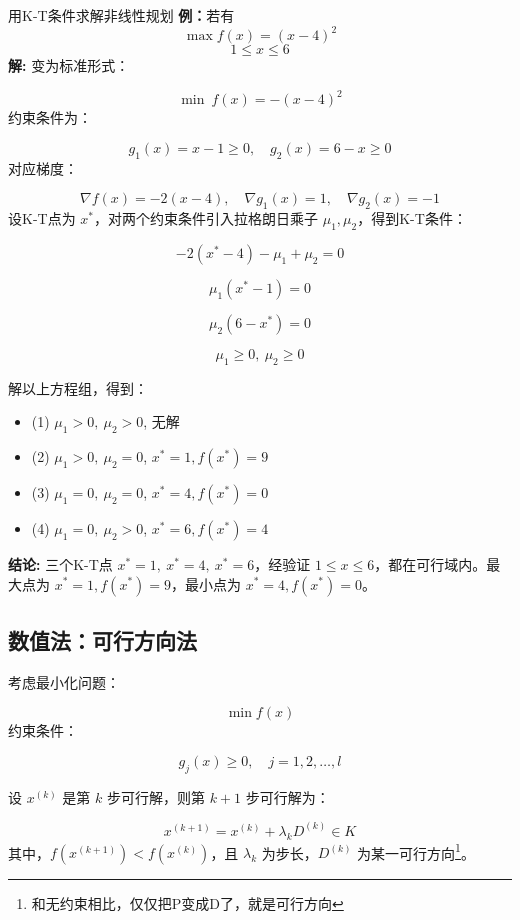 \begin{exbox}{用K-T条件求解非线性规划}{}
\textbf{例：}若有
$$
\max f(x)=(x-4)^2
$$
$$
1\leq x \leq 6
$$
\textbf{解:} 变为标准形式：

\[
\min \ f(x) = -(x-4)^2
\]
约束条件为：

\[
g_1(x) = x - 1 \geq 0, \quad g_2(x) = 6 - x \geq 0
\]
对应梯度：

\[
\nabla f(x) = -2(x - 4), \quad \nabla g_1(x) = 1, \quad \nabla g_2(x) = -1
\]
设K-T点为 \( x^* \)，对两个约束条件引入拉格朗日乘子 \( \mu_1, \mu_2 \)，得到K-T条件：

\[
-2(x^* - 4) - \mu_1 + \mu_2 = 0
\]

\[
\mu_1 (x^* - 1) = 0
\]

\[
\mu_2 (6 - x^*) = 0
\]

\[
\mu_1 \geq 0, \ \mu_2 \geq 0
\]

解以上方程组，得到：
\begin{itemize}
    \item (1) \( \mu_1 > 0, \ \mu_2 > 0 \), 无解
    \item (2) \( \mu_1 > 0, \ \mu_2 = 0 \), \( x^* = 1, f(x^*) = 9 \)
    \item (3) \( \mu_1 = 0, \ \mu_2 = 0 \), \( x^* = 4, f(x^*) = 0 \)
    \item (4) \( \mu_1 = 0, \ \mu_2 > 0 \), \( x^* = 6, f(x^*) = 4 \)
\end{itemize}

\textbf{结论:} 三个K-T点 \( x^* = 1, \ x^* = 4, \ x^* = 6 \)，经验证 \( 1 \leq x \leq 6 \)，都在可行域内。最大点为 \( x^* = 1, f(x^*) = 9 \)，最小点为 \( x^* = 4, f(x^*) = 0 \)。
\end{exbox}


\subsection{数值法：可行方向法}
\label{sec:可行方向法}
考虑最小化问题：

\[
\min f(x)
\]
约束条件：

\[
g_j(x) \geq 0, \quad j = 1, 2, \dots, l
\]

设 \( x^{(k)} \) 是第 \( k \) 步可行解，则第 \( k+1 \) 步可行解为：

\[
x^{(k+1)} = x^{(k)} + \lambda_k D^{(k)} \in K
\]
其中，\( f(x^{(k+1)}) < f(x^{(k)}) \)，且 \( \lambda_k \) 为步长，\( D^{(k)} \) 为某一可行方向\footnote{和无约束相比，仅仅把P变成D了，就是可行方向}。

